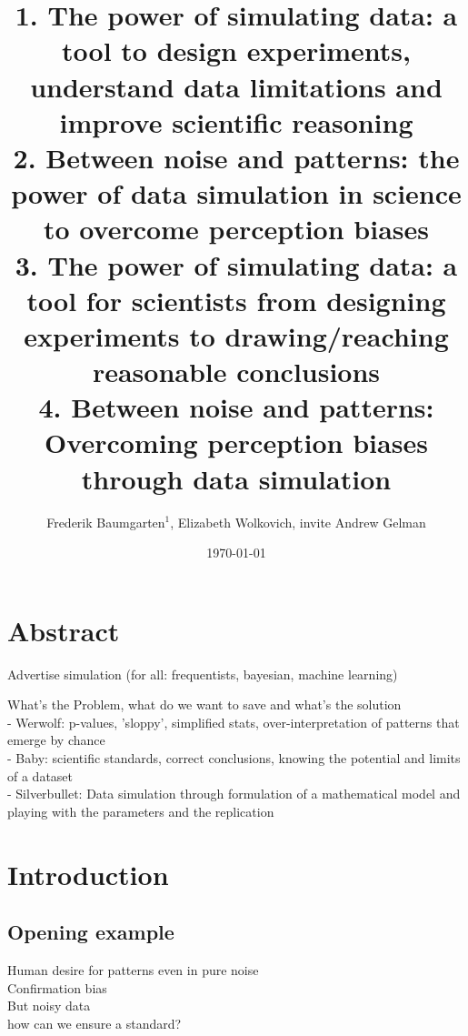\documentclass{article}
\begin{document}
	\renewcommand{\bibname}{References}%
	
	
	
	\title{1. The power of simulating data: a tool to design experiments, understand data limitations and improve scientific reasoning \\%
		
		2. Between noise and patterns: the power of data simulation in science to overcome perception biases\\
		3. The power of simulating data: a tool for scientists from designing experiments to drawing/reaching reasonable conclusions\\
		4. Between noise and patterns: Overcoming perception biases through data simulation
	} 
	
	
	\date{\today}
	\author{Frederik Baumgarten$^1$, Elizabeth Wolkovich, invite Andrew Gelman}
	\maketitle 
	
	\section*{Abstract}
	Advertise simulation (for all: frequentists, bayesian, machine learning)
	
	What's the Problem, what do we want to save and what's the solution\\
	- Werwolf: p-values, 'sloppy', simplified stats, over-interpretation of patterns that emerge by chance\\
	- Baby: scientific standards, correct conclusions, knowing the potential and limits of a dataset\\
	- Silverbullet: Data simulation through formulation of a mathematical model and playing with the parameters and the replication\\

	
	
	\section{Introduction}

			\subsection*{Opening example}
			Human desire for patterns even in pure noise \\
			Confirmation bias\\
			But noisy data\\
			how can we ensure a standard?\\
\end{document}
